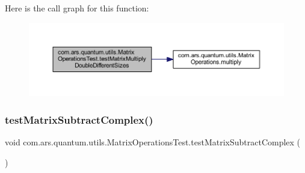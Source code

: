 Here is the call graph for this function\+:\nopagebreak
\begin{figure}[H]
\begin{center}
\leavevmode
\includegraphics[width=350pt]{classcom_1_1ars_1_1quantum_1_1utils_1_1_matrix_operations_test_aabeb9f046a3146998afea51488839af6_cgraph}
\end{center}
\end{figure}
\hypertarget{classcom_1_1ars_1_1quantum_1_1utils_1_1_matrix_operations_test_a7b8069b3de70b2eb9d655eb142002d0b}{}\label{classcom_1_1ars_1_1quantum_1_1utils_1_1_matrix_operations_test_a7b8069b3de70b2eb9d655eb142002d0b} 
\subsubsection{\texorpdfstring{test\+Matrix\+Subtract\+Complex()}{testMatrixSubtractComplex()}}
{\footnotesize\ttfamily void com.\+ars.\+quantum.\+utils.\+Matrix\+Operations\+Test.\+test\+Matrix\+Subtract\+Complex (\begin{DoxyParamCaption}{ }\end{DoxyParamCaption})}

